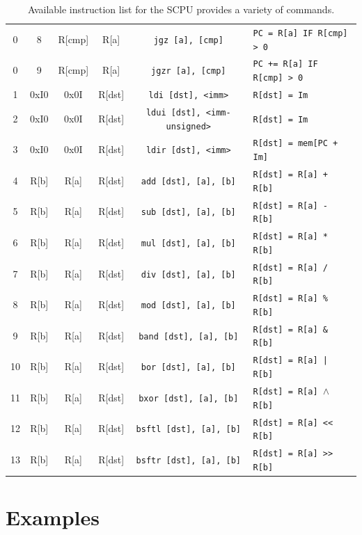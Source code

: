 \documentclass{article}
\begin{document}
\begin{table}[h!]
\begin{footnotesize}
\begin{tabular}{cccc|c|l}
			0 & 8 & R[cmp] & R[a] & \texttt{jgz [a], [cmp]} & \texttt{PC = R[a] IF R[cmp] > 0} \\
			0 & 9 & R[cmp] & R[a] & \texttt{jgzr [a], [cmp]} & \texttt{PC += R[a] IF R[cmp] > 0} \\
			1 & 0xI0 & 0x0I & R[dst] & \texttt{ldi [dst], <imm>} & \texttt{R[dst] = Im} \\
			2 & 0xI0 & 0x0I & R[dst] & \texttt{ldui [dst], <imm-unsigned>} & \texttt{R[dst] = Im} \\
			3 & 0xI0 & 0x0I & R[dst] & \texttt{ldir [dst], <imm>} & \texttt{R[dst] = mem[PC + Im]} \\
			4 & R[b] & R[a] & R[dst] & \texttt{add [dst], [a], [b]} & \texttt{R[dst] = R[a] + R[b]} \\
			5 & R[b] & R[a] & R[dst] & \texttt{sub [dst], [a], [b]} & \texttt{R[dst] = R[a] - R[b]} \\
			6 & R[b] & R[a] & R[dst] & \texttt{mul [dst], [a], [b]} & \texttt{R[dst] = R[a] * R[b]} \\
			7 & R[b] & R[a] & R[dst] & \texttt{div [dst], [a], [b]} & \texttt{R[dst] = R[a] / R[b]} \\
			8 & R[b] & R[a] & R[dst] & \texttt{mod [dst], [a], [b]} & \texttt{R[dst] = R[a] \% R[b]} \\
			9 & R[b] & R[a] & R[dst] & \texttt{band [dst], [a], [b]} & \texttt{R[dst] = R[a] \& R[b]} \\
			10 & R[b] & R[a] & R[dst] & \texttt{bor [dst], [a], [b]} & \texttt{R[dst] = R[a] | R[b]} \\
			11 & R[b] & R[a] & R[dst] & \texttt{bxor [dst], [a], [b]} & \texttt{R[dst] = R[a] $\wedge$ R[b]} \\
			12 & R[b] & R[a] & R[dst] & \texttt{bsftl [dst], [a], [b]} & \texttt{R[dst] = R[a] << R[b]} \\
			13 & R[b] & R[a] & R[dst] & \texttt{bsftr [dst], [a], [b]} & \texttt{R[dst] = R[a] >> R[b]} \\
			\hline
		\end{tabular}
	\end{footnotesize}
	\caption{Available instruction list for the SCPU provides a variety of commands.}
	\label{table:instruction-table}
\end{table}

\pagebreak

\section{Examples}
\end{document}
